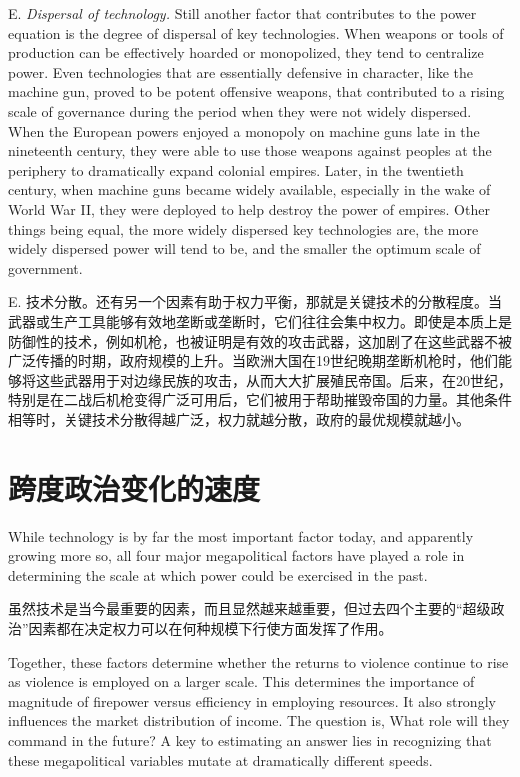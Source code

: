 \begin{Parallel}{97mm}{72mm}
  \ParallelLText
  {E. \emph{Dispersal of technology.} Still another factor that contributes to the power equation is the degree of dispersal of key technologies. When weapons or tools of production can be effectively hoarded or monopolized, they tend to centralize power. Even technologies that are essentially defensive in character, like the machine gun, proved to be potent offensive weapons, that contributed to a rising scale of governance during the period when they were not widely dispersed. When the European powers enjoyed a monopoly on machine guns late in the nineteenth century, they were able to use those weapons against peoples at the periphery to dramatically expand colonial empires. Later, in the twentieth century, when machine guns became widely available, especially in the wake of World War II, they were deployed to help destroy the power of empires. Other things being equal, the more widely dispersed key technologies are, the more widely dispersed power will tend to be, and the smaller the optimum scale of government.}
  
  \ParallelRText
  {E. 技术分散。还有另一个因素有助于权力平衡，那就是关键技术的分散程度。当武器或生产工具能够有效地垄断或垄断时，它们往往会集中权力。即使是本质上是防御性的技术，例如机枪，也被证明是有效的攻击武器，这加剧了在这些武器不被广泛传播的时期，政府规模的上升。当欧洲大国在19世纪晚期垄断机枪时，他们能够将这些武器用于对边缘民族的攻击，从而大大扩展殖民帝国。后来，在20世纪，特别是在二战后机枪变得广泛可用后，它们被用于帮助摧毁帝国的力量。其他条件相等时，关键技术分散得越广泛，权力就越分散，政府的最优规模就越小。}
  \ParallelPar

  \section{跨度政治变化的速度}


  \ParallelLText
  {While technology is by far the most important factor today, and apparently growing more so, all four major megapolitical factors have played a role in determining the scale at which power could be exercised in the past.}
  
  \ParallelRText
  {虽然技术是当今最重要的因素，而且显然越来越重要，但过去四个主要的“超级政治”因素都在决定权力可以在何种规模下行使方面发挥了作用。}
  \ParallelPar


  \ParallelLText
  {Together, these factors determine whether the returns to violence continue to rise as violence is employed on a larger scale. This determines the importance of magnitude of firepower versus efficiency in employing resources. It also strongly influences the market distribution of income. The question is, What role will they command in the future? A key to estimating an answer lies in recognizing that these megapolitical variables mutate at dramatically different speeds.}
  

\end{Parallel}
